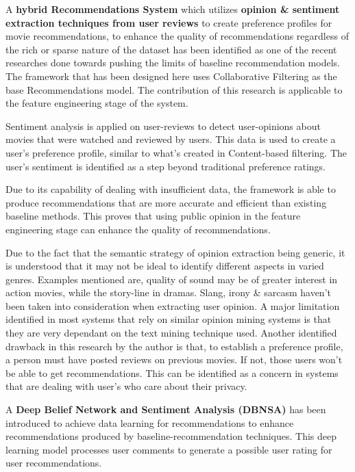 \bigbreak

A \textbf{hybrid Recommendations System} \autocite{cheng_hybrid_2020} which utilizes \textbf{opinion \& sentiment extraction techniques from user reviews} to create preference profiles for movie recommendations, to enhance the quality of recommendations regardless of the rich or sparse nature of the dataset has been identified as one of the recent researches done towards pushing the limits of baseline recommendation models. The framework that has been designed here uses Collaborative Filtering as the base Recommendations model. The contribution of this research is applicable to the feature engineering stage of the system.

Sentiment analysis is applied on user-reviews to detect user-opinions about movies that were watched and reviewed by users. This data is used to create a user's preference profile, similar to what's created in Content-based filtering. The user's sentiment is identified as a step beyond traditional preference ratings.

Due to its capability of dealing with insufficient data, the framework is able to produce recommendations that are more accurate and efficient than existing baseline methods. This proves that using public opinion in the feature engineering stage can enhance the quality of recommendations.

Due to the fact that the semantic strategy of opinion extraction being generic, it is understood that it may not be ideal to identify different aspects in varied genres. Examples mentioned are, quality of sound may be of greater interest in action movies, while the story-line in dramas.
Slang, irony \& sarcasm haven't been taken into consideration when extracting user opinion.
A major limitation identified in most systems that rely on similar opinion mining systems is that they are very dependant on the text mining technique used. Another identified drawback in this research by the author is that, to establish a preference profile, a person must have posted reviews on previous movies. If not, those users won't be able to get recommendations. This can be identified as a concern in systems that are dealing with user's who care about their privacy.

\bigbreak

A \textbf{Deep Belief Network and Sentiment Analysis (DBNSA)} has been introduced to achieve data learning for recommendations \autocite{chen_user_2019} to enhance recommendations produced by baseline-recommendation techniques. This deep learning model  processes user comments to generate a possible user rating for user recommendations.

